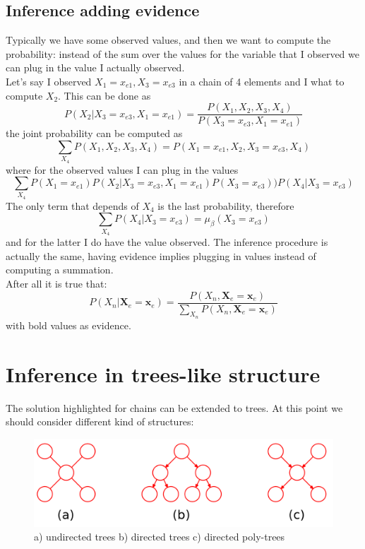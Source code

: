 \subsection{Inference adding evidence}
Typically we have some observed values, and then we want to compute the
probability: instead of the sum over the values for the variable that I observed
we can plug in the value I actually observed.\\ Let's say I observed $X_{1} = x_{e1}
, X_{3} = x_{e3}$ in a chain of 4 elements and I what to compute $X_{2}$. This
can be done as
\[
	P(X_{2}|X_{3} = x_{e3}, X_{1} = x_{e1}) = \frac{P(X_{1}, X_{2}, X_{3}, X_{4})}{P(X_{3}
	= x_{e3}, X_{1} = x_{e1})}
\]
the joint probability can be computed as
\[
	\sum_{X_4}P(X_{1}, X_{2}, X_{3}, X_{4}) = P(X_{1} = x_{e1}, X_{2}, X_{3} = x_{e3}
	, X_{4})
\]
where for the observed values I can plug in the values
\[
	\sum_{X_4}P(X_{1} = x_{e1})P(X_{2}|X_{3} = x_{e3}, X_{1} = x_{e1})P(X_{3} = x_{e3}
	))P(X_{4}|X_{3} = x_{e3})
\]
The only term that depends of $X_{4}$ is the last probability, therefore
\[
	\sum_{X_4}P(X_{4}|X_{3} = x_{e3}) = \mu_{\beta}(X_{3} = x_{e3})
\]
and for the latter I do have the value observed. The inference procedure is
actually the same, having evidence implies plugging in values instead of computing
a summation.\\

After all it is true that:
\begin{equation}
	P(X_{n}|\textbf{X}_{e} = \textbf{x}_{e}) = \frac{P(X_{n}, \textbf{X}_{e} =
	\textbf{x}_{e})}{\sum_{X_n}P(X_{n}, \textbf{X}_{e} = \textbf{x}_{e})}
\end{equation}
with bold values as evidence.

\section{Inference in trees-like structure}
The solution highlighted for chains can be extended to trees. At this point we
should consider different kind of structures:
\begin{figure}[H]
	\centering
	\includegraphics[scale=0.3]{
		images/09_BayesianNetworksInference_treesInferences.png
	}
	\caption{a) undirected trees b) directed trees c) directed poly-trees}
	\label{fig:trees_structure}
\end{figure}

